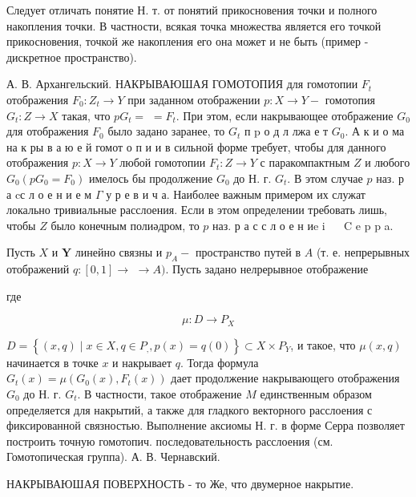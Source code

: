 \documentclass[10pt]{article}
\begin{document}
Следует отличать понятие Н. т. от понятий прикосновения точки и полного накопления точки. В частности, всякая точка множества является его точкой прикосновения, точкой же накопления его она может и не быть (пример - дискретное пространство).



А. В. Архангельский. НАКРЫВАЮШАЯ ГОМОТОПИЯ для гомотопии $F_{t}$ отображения $F_{0}: Z_{t} \rightarrow Y$ при заданном отображении $p: X \rightarrow Y-$ гомотопия $G_{t}: Z \rightarrow X$ такая, что $p G_{t}=$ $=F_{t}$. При этом, если накрывающее отображение $G_{0}$ для отображения $F_{0}$ было задано заранее, то $G_{t}$ п $\mathrm{p}$ о д л лжа е т $G_{0}$. А к и о ма на к ры в а ю е й гомот о п и и в сильной форме требует, чтобы для данного отображения $p: X \rightarrow Y$ любой гомотопии $F_{t}: Z \rightarrow Y$ с паракомпактным $Z$ и любого $G_{0}\left(p G_{0}=F_{0}\right)$ имелось бы продолжение $G_{0}$ до Н. г. $G_{t}$. В этом случае $p$ наз. р а cс л о е н и е м $\Gamma$ у р е в и ч а. Наиболее важным примером их служат локально тривиальные расслоения. Если в этом определении требовать лишь, чтобы $Z$ было конечным полиәдром, то $p$ наз. р а с с л о е н иe i $\quad$ C e p p a.



Пусть $X$ и $\boldsymbol{Y}$ линейно связны и $p_{A}-$ пространство путей в $A$ (т. е. непрерывных отображений $q:[0,1] \rightarrow$ $\rightarrow A)$. Пусть задано нелрерывное отображение



где



\[

\mu: D \longrightarrow P_{X}

\]



$D=\left\{(x, q) \mid x \in X, q \in P_{,}, p(x)=q(0)\right\} \subset X \times P_{Y}$, и такое, что $\mu(x, q)$ начинается в точке $x$ и накрывает $q$. Тогда формула $G_{t}(x)=\mu\left(G_{0}(x), F_{t}(x)\right)$ дает продолжение накрывающего отображения $G_{0}$ до Н. г. $G_{t}$. В частности, такое отображение $M$ единственным образом определяется для накрытий, а также для гладкого векторного расслоения с фиксированной связностью. Выполнение аксиомы Н. г. в форме Серра позволяет построить точную гомотопич. последовательность расслоения (см. Гомотопическая группа). А. В. Чернавский.



НАКРЫВАЮШАЯ ПОВЕРХНОСТЬ - то Же, что двумерное накрытие.
\end{document}
